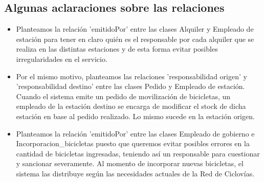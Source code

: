 \subsection{Algunas aclaraciones sobre las relaciones}

\begin{itemize}
	\item Planteamos la relación 'emitidoPor' entre las clases Alquiler y Empleado de estación para tener en claro quién es el responsable por cada alquiler que se realiza en las distintas estaciones y de esta forma evitar posibles irregularidades en el servicio.
	\item Por el mismo motivo, planteamos las relaciones 'responsabilidad origen' y 'responsabilidad destino' entre las clases Pedido y Empleado de estación. Cuando el sistema emite un pedido de movilización de bicicletas, un empleado de la estación destino se encarga de modificar el stock de dicha estación en base al pedido realizado. Lo mismo sucede en la estación origen.
	\item Planteamos la relación 'emitidoPor' entre las clases Empleado de gobierno e Incorporacion\_bicicletas puesto que queremos evitar posibles errores en la cantidad de bicicletas ingresadas, teniendo así un responsable para cuestionar y sancionar severamente. Al momento de incorporar nuevas bicicletas, el sistema las distribuye según las necesidades actuales de la Red de Ciclovías. 
\end{itemize}




